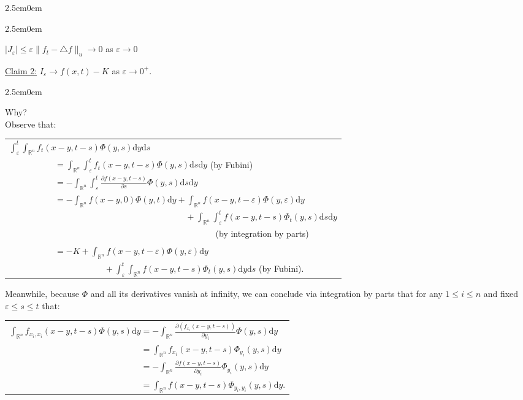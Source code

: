 \documentclass{book}
\newcommand{\exPPP}{%
   \color{VioletRed}%
   \fontsize{12}{14}\selectfont%
}
\newenvironment{myIndent}{%
   \begin{adjustwidth}{2.5em}{0em}%
}{%
   \end{adjustwidth}%
}
\newcommand{\df}{\mathrm{d}}
\newcommand{\retTwo}{\hfill\bigbreak}
\begin{document}
\begin{myIndent}
\begin{myIndent}
		{\centering$|J_\varepsilon| \leq \varepsilon \|f_t - \triangle f\|_u \to 0$ as $\varepsilon \to 0$\retTwo\par}
	\end{myIndent}

	\ul{Claim 2:} $I_\varepsilon \to f(x, t) - K$ as $\varepsilon \to 0^+$.
	\begin{myIndent}\exPPP
		Why?\\
		Observe that:

		{\centering\begin{tabular}{l}
			$\int_\varepsilon^t \int_{\mathbb{R}^n}f_t(x - y, t - s)\Phi(y, s)\df y \df s$\\ [4pt]
			$\phantom{aaaaaaaaaa} = \int_{\mathbb{R}^n} \int_\varepsilon^t f_t(x - y, t - s)\Phi(y, s) \df s \df y$ {\color{red}(by Fubini)}\\ [4pt]
			$\phantom{aaaaaaaaaa} = -\int_{\mathbb{R}^n} \int_\varepsilon^t \frac{\partial f(x - y, t - s)}{\partial s}\Phi(y, s) \df s \df y$\\ [4pt]
			$\phantom{aaaaaaaaaa} = -\int_{\mathbb{R}^n} f(x - y, 0)\Phi(y, t)\df y + \int_{\mathbb{R}^n} f(x - y, t - \varepsilon)\Phi(y, \varepsilon) \df y$\\
			$\phantom{aaaaaaaaaaaa = -\int_{\mathbb{R}^n} f(x - y, 0)\Phi(y, t)\df y} + \int_{\mathbb{R}^n} \int_\varepsilon^t f(x - y, t - s)\Phi_t(y, s) \df s \df y$\\
			$\phantom{aaaaaaaaaaaaaaaaaa = -\int_{\mathbb{R}^n} f(x - y, 0)\Phi(y, t)\df y}$ {\color{red}(by integration by parts)}\\ [4pt]
			$\phantom{aaaaaaaaaa} = -K + \int_{\mathbb{R}^n} f(x - y, t - \varepsilon)\Phi(y, \varepsilon) \df y$\\
			$\phantom{aaaaaaaaaaaaaaaaa - K} + \int_\varepsilon^t\int_{\mathbb{R}^n} f(x - y, t - s)\Phi_t(y, s) \df y \df s$ {\color{red}(by Fubini)}.
		\end{tabular}\newpage\par}

		Meanwhile, because $\Phi$ and all its derivatives vanish at infinity, we can conclude via integration by parts that for any $1 \leq i \leq n$ and fixed $\varepsilon \leq s \leq t$ that:

		{\center\begin{tabular}{l}
			$\int_{\mathbb{R}^n} f_{x_i, x_i}(x - y, t - s)\Phi(y, s)\df y = -\int_{\mathbb{R}^n}\frac{\partial(f_{x_i}(x - y, t - s))}{\partial y_i} \Phi(y, s) \df y$\\ [4pt]
			$\phantom{\int_{\mathbb{R}^n} f_{x_i, x_i}(x - y, t - s)\Phi(y, s)\df y} = \int_{\mathbb{R}^n} f_{x_i}(x - y, t - s)\Phi_{y_i}(y, s) \df y$\\ [4pt]
			$\phantom{\int_{\mathbb{R}^n} f_{x_i, x_i}(x - y, t - s)\Phi(y, s)\df y} = -\int_{\mathbb{R}^n} \frac{\partial f(x - y, t - s)}{\partial y_i}\Phi_{y_i}(y, s) \df y$\\ [4pt]
			$\phantom{\int_{\mathbb{R}^n} f_{x_i, x_i}(x - y, t - s)\Phi(y, s)\df y} = \int_{\mathbb{R}^n} f(x - y, t - s)\Phi_{y_i, y_i}(y, s) \df y$.\\ [4pt]
		\end{tabular}\retTwo\par}


\end{myIndent}
\end{myIndent}
\end{document}
